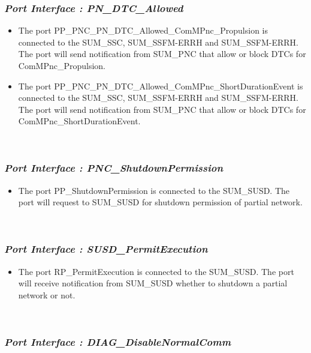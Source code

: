 \subsubsection{\textit{Port Interface : PN_DTC_Allowed}}

\begin{itemize}
	\item The port PP_PNC_PN_DTC_Allowed_ComMPnc_Propulsion is connected to the SUM_SSC, SUM_SSFM-ERRH and SUM_SSFM-ERRH. The port will send
    notification from SUM_PNC that allow or block DTCs for ComMPnc_Propulsion.
\end{itemize}

\begin{itemize}
	\item The port PP_PNC_PN_DTC_Allowed_ComMPnc_ShortDurationEvent is connected to the SUM_SSC, SUM_SSFM-ERRH and SUM_SSFM-ERRH. The port will send
    notification from SUM_PNC that allow or block DTCs for ComMPnc_ShortDurationEvent.
\end{itemize}
\\
\subsubsection{\textit{Port Interface : PNC_ShutdownPermission}}

\begin{itemize}
	\item The port PP_ShutdownPermission is connected to the SUM_SUSD. The port will request to SUM_SUSD for shutdown permission of partial network.
\end{itemize}
\\
\subsubsection{\textit{Port Interface : SUSD_PermitExecution}}
\begin{itemize}
	\item The port RP_PermitExecution is connected to the SUM_SUSD. The port will receive notification from SUM_SUSD whether to shutdown a partial network or not.
\end{itemize}
\\
\subsubsection{\textit{Port Interface : DIAG_DisableNormalComm}}

